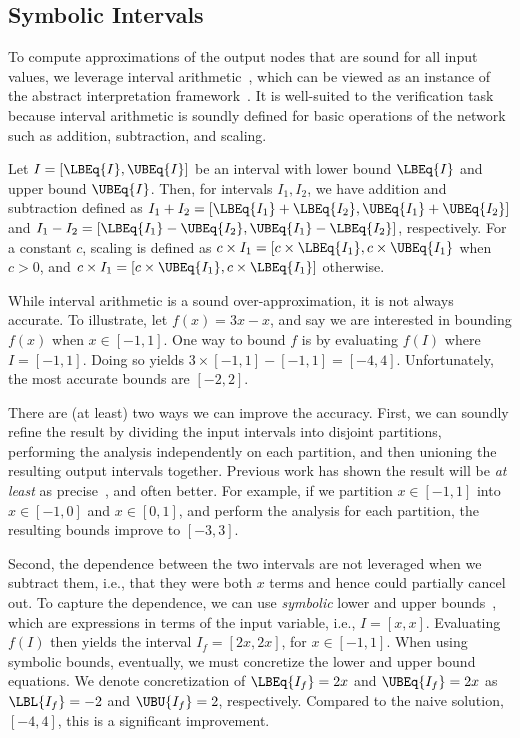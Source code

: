 \subsection{Symbolic Intervals}

To compute approximations of the output nodes that are sound for all
input values, we leverage interval
arithmetic~\cite{moore2009introduction}, which can be viewed as an
instance of the abstract interpretation framework~\cite{CousotC77}. It
is well-suited to the verification task because interval arithmetic is
soundly defined for basic operations of the network such as addition,
subtraction, and scaling.

Let $ I = [\LBEq{I}, \UBEq{I}] $ be an interval with lower bound
$ \LBEq{I} $ and upper bound $ \UBEq{I} $. Then, for intervals $ I_1,
I_2 $, we have addition and subtraction defined as $ I_1 + I_2 =
[\LBEq{I_1} + \LBEq{I_2}, \UBEq{I_1} + \UBEq{I_2}] $ and $ I_1 - I_2 =
[\LBEq{I_1} - \UBEq{I_2}, \UBEq{I_1} - \LBEq{I_2}] $, respectively.
For a constant $ c $, scaling is defined as $ c \times I_1 =
[c \times \LBEq{I_1}, c \times \UBEq{I_1} $ when $ c > 0 $, and $
c \times I_1 = [c \times \UBEq{I_1}, c \times \LBEq{I_1}] $ otherwise.

While interval arithmetic is a sound over-approximation, it is not
always accurate.  To illustrate, let $ f(x) = 3x - x $, and say we are
interested in bounding $ f(x) $ when $ x \in [-1, 1] $. One way to
bound $ f $ is by evaluating $ f(I) $ where $ I = [-1, 1] $. Doing so
yields $ 3 \times [-1, 1] - [-1, 1] = [-4, 4] $. Unfortunately, the most
accurate bounds are $ [-2, 2] $.


There are (at least) two ways we can improve the accuracy. First, we can
soundly refine the result by dividing the input intervals into disjoint
partitions, performing the analysis independently on each partition, and then
unioning the resulting output intervals together. Previous work has shown the
result will be \textit{at least} as precise~\cite{WangPWYJ18}, and often
better. For example, if we partition $ x \in [-1, 1] $ into $x\in[-1,0]$ and
$x\in[0,1]$, and perform the analysis for each partition, the
resulting bounds improve to $ [-3, 3] $.

Second, the dependence between the two intervals are
not leveraged when we subtract them, i.e., that they were both $ x $
terms and hence could partially cancel out.
To capture the dependence, we can use \textit{symbolic} lower and
upper bounds~\cite{WangPWYJ18}, which are expressions in
terms of the input variable, i.e., $ I = [x, x] $.  Evaluating $ f(I)
$ then yields the interval $ I_f = [2x, 2x] $, for $x\in[-1,1]$.  When using
symbolic bounds, eventually, we must concretize the lower and upper
bound equations. We denote concretization of $\LBEq{I_f}=2x$ and
$\UBEq{I_f}=2x$ as $ \LBL{I_f} = -2 $ and $ \UBU{I_f} = 2 $,
respectively.  Compared to the naive solution, $[-4,4]$, this is a
significant improvement.

